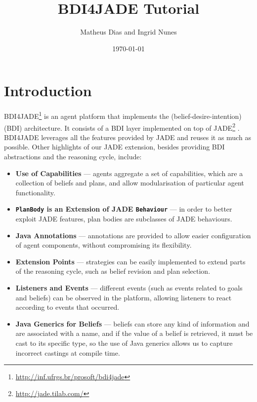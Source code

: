 \documentclass{article}
\title{BDI4JADE Tutorial}
\author{Matheus Dias and Ingrid Nunes}
\date{\today}
\begin{document}
\maketitle

\tableofcontents

\newpage

\section{Introduction}\label{sec:introduction}

BDI4JADE\footnote{\url{http://inf.ufrgs.br/prosoft/bdi4jade}} is an agent platform that implements the (belief-desire-intention) (BDI) \cite{Rao:AAMAS1995:BDIArch} architecture. It consists of a BDI layer implemented on top of JADE\footnote{\url{http://jade.tilab.com/}} \cite{Bellifemine:book2007:JADE}. BDI4JADE leverages all the features provided by JADE and reuses it as much as possible. Other highlights of our JADE extension, besides providing BDI abstractions and the reasoning cycle, include:

\begin{itemize}

    \item \textbf{Use of Capabilities} --- agents aggregate a set of capabilities, which are a collection of beliefs and plans, and allow modularisation of particular agent functionality.

    \item \textbf{\texttt{PlanBody} is an Extension of JADE \texttt{Behaviour}} --- in order to better exploit JADE features, plan bodies are subclasses of JADE behaviours.

    \item \textbf{Java Annotations} --- annotations are provided to allow easier configuration of agent components, without compromising its flexibility.

    \item \textbf{Extension Points} --- strategies can be easily implemented to extend parts of the reasoning cycle, such as  belief revision and plan selection.

    \item \textbf{Listeners and Events} --- different events (such as events related to goals and beliefs) can be observed in the platform, allowing listeners to react according to events that occurred.

    \item \textbf{Java Generics for Beliefs} --- beliefs can store any kind of information and are associated with a name, and if the value of a belief is retrieved, it must be cast to its specific type, so the use of Java generics allows us to capture incorrect castings at compile time.

\end{itemize}
\end{document}
